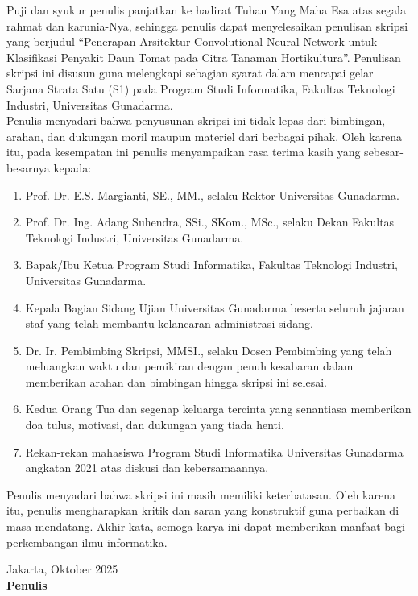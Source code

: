 \documentclass[12pt,a4paper,oneside]{report}
\begin{document}
\noindent
Puji dan syukur penulis panjatkan ke hadirat Tuhan Yang Maha Esa atas segala rahmat dan karunia-Nya, sehingga penulis dapat menyelesaikan penulisan skripsi yang berjudul ``Penerapan Arsitektur Convolutional Neural Network untuk Klasifikasi Penyakit Daun Tomat pada Citra Tanaman Hortikultura''. Penulisan skripsi ini disusun guna melengkapi sebagian syarat dalam mencapai gelar Sarjana Strata Satu (S1) pada Program Studi Informatika, Fakultas Teknologi Industri, Universitas Gunadarma.\\[0.3cm]

\noindent
Penulis menyadari bahwa penyusunan skripsi ini tidak lepas dari bimbingan, arahan, dan dukungan moril maupun materiel dari berbagai pihak. Oleh karena itu, pada kesempatan ini penulis menyampaikan rasa terima kasih yang sebesar-besarnya kepada:
\begin{enumerate}
  \item Prof. Dr. E.S. Margianti, SE., MM., selaku Rektor Universitas Gunadarma.
  \item Prof. Dr. Ing. Adang Suhendra, SSi., SKom., MSc., selaku Dekan Fakultas Teknologi Industri, Universitas Gunadarma.
  \item Bapak/Ibu Ketua Program Studi Informatika, Fakultas Teknologi Industri, Universitas Gunadarma.
  \item Kepala Bagian Sidang Ujian Universitas Gunadarma beserta seluruh jajaran staf yang telah membantu kelancaran administrasi sidang.
  \item Dr. Ir. Pembimbing Skripsi, MMSI., selaku Dosen Pembimbing yang telah meluangkan waktu dan pemikiran dengan penuh kesabaran dalam memberikan arahan dan bimbingan hingga skripsi ini selesai.
  \item Kedua Orang Tua dan segenap keluarga tercinta yang senantiasa memberikan doa tulus, motivasi, dan dukungan yang tiada henti.
  \item Rekan-rekan mahasiswa Program Studi Informatika Universitas Gunadarma angkatan 2021 atas diskusi dan kebersamaannya.
\end{enumerate}

\noindent
Penulis menyadari bahwa skripsi ini masih memiliki keterbatasan. Oleh karena itu, penulis mengharapkan kritik dan saran yang konstruktif guna perbaikan di masa mendatang. Akhir kata, semoga karya ini dapat memberikan manfaat bagi perkembangan ilmu informatika.\\[1cm]

\begin{flushright}
  \begin{minipage}{0.4\textwidth}
    Jakarta, Oktober 2025\\[2cm]
    \textbf{Penulis}
  \end{minipage}
\end{flushright}
\newpage
\end{document}
